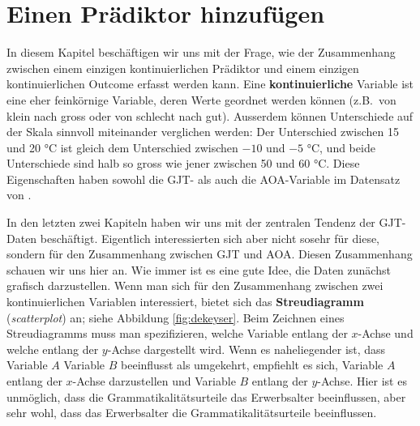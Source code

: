 \documentclass[oneside, 10pt]{book}\usepackage[]{graphicx}\usepackage[]{xcolor}
\begin{document}
\chapter{Einen Prädiktor hinzufügen}\label{ch:simpleregression}
In diesem Kapitel beschäftigen wir uns mit der Frage,
wie der Zusammenhang zwischen einem einzigen kontinuierlichen
Prädiktor und einem einzigen kontinuierlichen Outcome erfasst
werden kann. Eine \textbf{kontinuierliche} Variable ist eine
eher feinkörnige Variable, deren Werte geordnet werden können
(z.B.\ von klein nach gross oder von schlecht nach gut). Ausserdem
können Unterschiede auf der Skala sinnvoll miteinander verglichen
werden: Der Unterschied zwischen 15 und 20 °C ist gleich dem
Unterschied zwischen $-10$ und $-5$ °C,
und beide Unterschiede sind halb so gross wie jener
zwischen 50 und 60 °C. Diese Eigenschaften haben sowohl die
GJT- als auch die AOA-Variable im Datensatz von \citet{DeKeyser2010}.

In den letzten zwei Kapiteln haben wir uns mit der zentralen Tendenz
der GJT-Daten beschäftigt. Eigentlich interessierten sich \citet{DeKeyser2010}
aber nicht sosehr für diese, sondern für den Zusammenhang zwischen GJT und AOA.
Diesen Zusammenhang schauen wir uns hier an. Wie immer ist es eine gute
Idee, die Daten zunächst grafisch darzustellen.
Wenn man sich für den
Zusammenhang zwischen zwei kontinuierlichen Variablen interessiert,
bietet sich das \textbf{Streudiagramm} (\textit{scatterplot}) an;
siehe Abbildung \ref{fig:dekeyser}. Beim Zeichnen eines
Streudiagramms muss man spezifizieren, welche Variable entlang
der $x$-Achse und welche entlang der $y$-Achse dargestellt wird.
Wenn es naheliegender ist, dass Variable $A$ Variable $B$ beeinflusst
als umgekehrt, empfiehlt es sich, Variable $A$ entlang der $x$-Achse
darzustellen und Variable $B$ entlang der $y$-Achse. Hier ist es
unmöglich, dass die Grammatikalitätsurteile das Erwerbsalter
beeinflussen, aber sehr wohl, dass das Erwerbsalter die Grammatikalitätsurteile beeinflussen.
\end{document}
